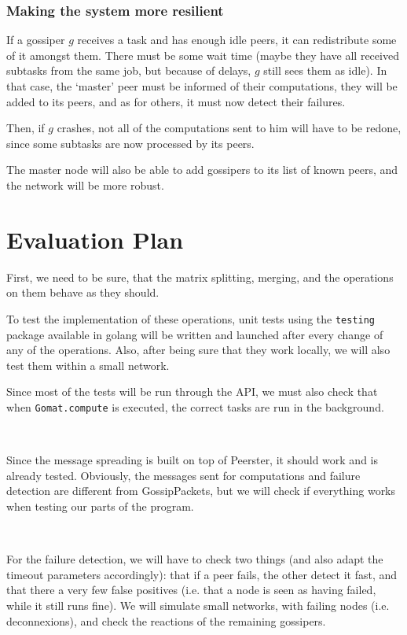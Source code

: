 \documentclass[a4paper,12pt]{article}
\begin{document}
    \subsubsection{Making the system more resilient}
    If a gossiper $g$ receives a task and has enough idle peers, it can redistribute some of it amongst them. There must be some wait time (maybe they have all received subtasks from the same job, but because of delays, $g$ still sees them as idle).
In that case, the ‘master’ peer must be informed of their computations, they will be added to its peers, and as for others, it must now detect their failures.

    Then, if $g$ crashes, not all of the computations sent to him will have to be redone, since some subtasks are now processed by its peers.

    The master node will also be able to add gossipers to its list of known peers, and the network will be more robust.

    \section{Evaluation Plan}
    First, we need to be sure, that the matrix splitting, merging, and the operations on them behave as they should.

    To test the implementation of these operations, unit tests using the \texttt{testing} package available in golang will be written and launched after every change of any of the operations. Also, after being sure that they work locally, we will also test them within a small network.

    Since most of the tests will be run through the API, we must also check that when \texttt{Gomat.compute} is executed, the correct tasks are run in the background.

~~

    Since the message spreading is built on top of Peerster, it should work and is already tested. Obviously, the messages sent for computations and failure detection are different from GossipPackets, but we will check if everything works when testing our parts of the program.

~~

    For the failure detection, we will have to check two things (and also adapt the timeout parameters accordingly): that if a peer fails, the other detect it fast, and that there a very few false positives (i.e. that a node is seen as having failed, while it still runs fine). We will simulate small networks, with failing nodes (i.e. deconnexions), and check the reactions of the remaining gossipers.
\end{document}
